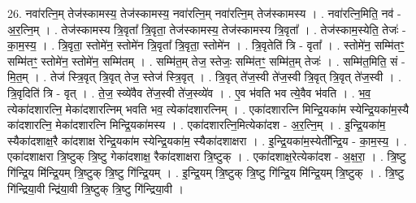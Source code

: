 \documentclass[17pt]{extarticle}
\begin{document}
26. नवा॑रत्नि॒म् तेज॑स्कामस्य॒ तेज॑स्कामस्य॒ नवा॑रत्नि॒म् नवा॑रत्नि॒म् तेज॑स्कामस्य । . नवा॑रत्नि॒मिति॒ नव॑ - अ॒र॒त्नि॒म् । . तेज॑स्कामस्य त्रि॒वृता᳚ त्रि॒वृता॒ तेज॑स्कामस्य॒ तेज॑स्कामस्य त्रि॒वृता᳚ । . तेज॑स्काम॒स्येति॒ तेजः॑ - का॒म॒स्य॒ । . त्रि॒वृता॒ स्तोमे॑न॒ स्तोमे॑न त्रि॒वृता᳚ त्रि॒वृता॒ स्तोमे॑न । . त्रि॒वृतेति॑ त्रि - वृता᳚ । . स्तोमे॑न॒ सम्मि॑तꣳ॒॒ सम्मि॑तꣳ॒॒ स्तोमे॑न॒ स्तोमे॑न॒ सम्मि॑तम् । . सम्मि॑त॒म् तेज॒ स्तेजः॒ सम्मि॑तꣳ॒॒ सम्मि॑त॒म् तेजः॑ । . सम्मि॑त॒मिति॒ सं - मि॒त॒म् । . तेज॑ स्त्रि॒वृत् त्रि॒वृत् तेज॒ स्तेज॑ स्त्रि॒वृत् । . त्रि॒वृत् ते॑ज॒स्वी ते॑ज॒स्वी त्रि॒वृत् त्रि॒वृत् ते॑ज॒स्वी । . त्रि॒वृदिति॑ त्रि - वृत् । . ते॒ज॒ स्व्ये॑वैव ते॑ज॒स्वी ते॑ज॒स्व्ये॑व । . ए॒व भ॑वति भव त्ये॒वैव भ॑वति । . भ॒व॒ त्येका॑दशारत्नि॒ मेका॑दशारत्निम् भवति भव॒ त्येका॑दशारत्निम् । . एका॑दशारत्नि मिन्द्रि॒यका॑म स्येन्द्रि॒यका॑म॒स्यै का॑दशारत्नि॒ मेका॑दशारत्नि मिन्द्रि॒यका॑मस्य । . एका॑दशारत्नि॒मित्येका॑दश - अ॒र॒त्नि॒म् । . इ॒न्द्रि॒यका॑म॒ स्यैका॑दशाक्ष॒रै का॑दशाक्ष रेन्द्रि॒यका॑म स्येन्द्रि॒यका॑म॒ स्यैका॑दशाक्षरा । . इ॒न्द्रि॒यका॑म॒स्येती᳚न्द्रि॒य - का॒म॒स्य॒ । . एका॑दशाक्षरा त्रि॒ष्टुक् त्रि॒ष्टु गेका॑दशाक्ष॒ रैका॑दशाक्षरा त्रि॒ष्टुक् । . एका॑दशाक्ष॒रेत्येका॑दश - अ॒क्ष॒रा॒ । . त्रि॒ष्टु गि॑न्द्रि॒य मि॑न्द्रि॒यम् त्रि॒ष्टुक् त्रि॒ष्टु गि॑न्द्रि॒यम् । . इ॒न्द्रि॒यम् त्रि॒ष्टुक् त्रि॒ष्टु गि॑न्द्रि॒य मि॑न्द्रि॒यम् त्रि॒ष्टुक् । . त्रि॒ष्टु गि॑न्द्रिया॒वी न्द्रि॑या॒वी त्रि॒ष्टुक् त्रि॒ष्टु गि॑न्द्रिया॒वी । \newline
\end{document}
